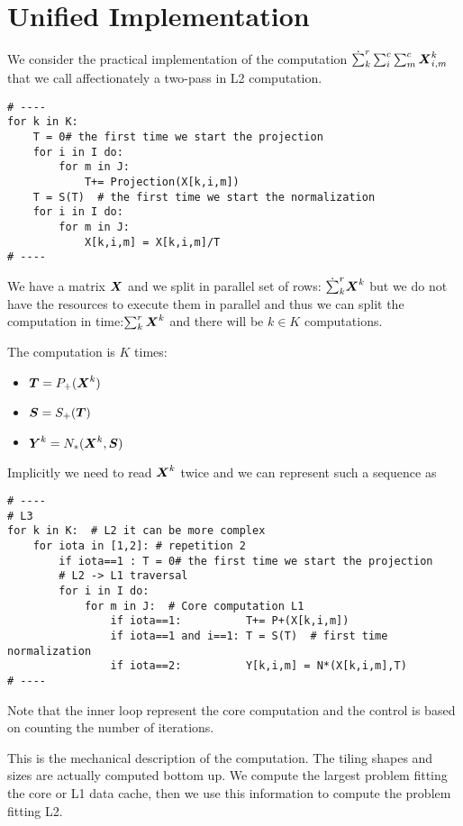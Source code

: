 \documentclass[acmsmall]{acmart}
\begin{document}
\section{Unified Implementation}

We consider the practical implementation of the computation
$\dot\sum_k^r\sum_{i}^c\sum_{m}^c{\boldsymbol X}^{k}_{i,m}$ that we call
affectionately a two-pass in L2 computation. 
\begin{verbatim}
# ----
for k in K: 
    T = 0# the first time we start the projection 
    for i in I do: 
        for m in J: 
            T+= Projection(X[k,i,m]) 
    T = S(T)  # the first time we start the normalization
    for i in I do: 
        for m in J: 
            X[k,i,m] = X[k,i,m]/T
# ----
\end{verbatim} 
We have a matrix ${\boldsymbol X}$ and we split in parallel set of rows:
$\dot\sum_k^r{\boldsymbol X}^{k}$ but we do not have the resources to execute
them in parallel and thus we can split the computation in
time:$\sum_k^r{\boldsymbol X}^{k}$ and there will be $k\in K$ computations.

The computation is $K$ times:
\begin{itemize}
\item ${\boldsymbol T} = P_+({\boldsymbol X}^k)$
\item ${\boldsymbol S} = S_+({\boldsymbol T})$
\item ${\boldsymbol Y}^k = N_*({\boldsymbol X}^k,{\boldsymbol S})$
\end{itemize}
Implicitly we need to read ${\boldsymbol X}^k$ twice and we can represent such
a sequence as
{\small
\begin{verbatim}
# ----
# L3 
for k in K:  # L2 it can be more complex  
    for iota in [1,2]: # repetition 2 
        if iota==1 : T = 0# the first time we start the projection 
        # L2 -> L1 traversal 
        for i in I do:  
            for m in J:  # Core computation L1
                if iota==1:          T+= P+(X[k,i,m]) 
                if iota==1 and i==1: T = S(T)  # first time normalization
                if iota==2:          Y[k,i,m] = N*(X[k,i,m],T)
# ----
\end{verbatim} }
Note that the inner loop represent the core computation and the
control is based on counting the number of iterations.

This is the mechanical description of the computation. The tiling
shapes and sizes are actually computed bottom up. We compute the
largest problem fitting the core or L1 data cache, then we use this
information to compute the problem fitting L2.
\end{document}
